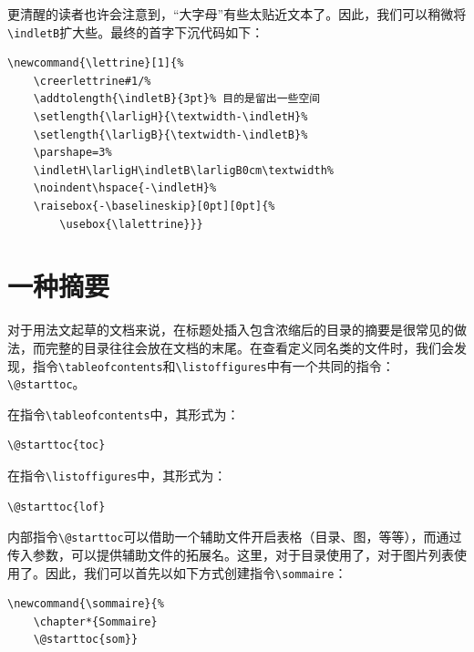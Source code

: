 更清醒的读者也许会注意到，“大字母”有些太贴近文本了。因此，我们可以稍微将\verb|\indletB|扩大些。最终的首字下沉代码如下：

\begin{dmd}
\begin{verbatim}
\newcommand{\lettrine}[1]{%
    \creerlettrine#1/%
    \addtolength{\indletB}{3pt}% 目的是留出一些空间
    \setlength{\larligH}{\textwidth-\indletH}% 
    \setlength{\larligB}{\textwidth-\indletB}% 
    \parshape=3% 
    \indletH\larligH\indletB\larligB0cm\textwidth% 
    \noindent\hspace{-\indletH}% 
    \raisebox{-\baselineskip}[0pt][0pt]{%
        \usebox{\lalettrine}}}
\end{verbatim}
\end{dmd}

\section{一种摘要}

对于用法文起草的文档来说，在标题处插入包含浓缩后的目录的摘要是很常见的做法，而完整的目录往往会放在文档的末尾。在查看定义同名类的文件时，我们会发现，指令\verb|\tableofcontents|和\verb|\listoffigures|中有一个共同的指令：\verb|\@starttoc|。

在指令\verb|\tableofcontents|中，其形式为：

\begin{dmd}
\begin{verbatim}
\@starttoc{toc}
\end{verbatim}
\end{dmd}

在指令\verb|\listoffigures|中，其形式为：

\begin{dmd}
\begin{verbatim}
\@starttoc{lof}
\end{verbatim}
\end{dmd}

内部指令\verb|\@starttoc|可以借助一个辅助文件开启表格（目录、图，等等），而通过传入参数，可以提供辅助文件的拓展名。这里，对于目录使用了，对于图片列表使用了。因此，我们可以首先以如下方式创建指令\verb|\sommaire|：

\begin{dmd}
\begin{verbatim}
\newcommand{\sommaire}{% 
    \chapter*{Sommaire} 
    \@starttoc{som}}
\end{verbatim}
\end{dmd}

